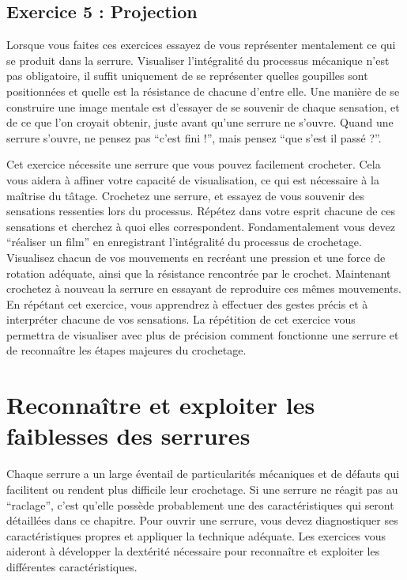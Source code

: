 \documentclass[a4paper,french,11pt,twoside]{report}
\begin{document}
\section{Exercice 5 : Projection}
Lorsque vous faites ces exercices essayez de vous représenter mentalement ce qui se produit dans la serrure. Visualiser l'intégralité du processus mécanique n'est pas obligatoire, il suffit uniquement de se représenter quelles goupilles sont positionnées et quelle est la résistance de chacune d'entre elle. Une manière de se construire une image mentale est d'essayer de se souvenir de chaque sensation, et de ce que l'on croyait obtenir, juste avant qu'une serrure ne s'ouvre. Quand une serrure s'ouvre, ne pensez pas \enquote{c'est fini !}, mais pensez \enquote{que s'est il passé ?}.

Cet exercice nécessite une serrure que vous pouvez facilement crocheter. Cela vous aidera à affiner votre capacité de visualisation, ce qui est nécessaire à la maîtrise du tâtage. Crochetez une serrure, et essayez de vous souvenir des sensations ressenties lors du processus. Répétez dans votre esprit chacune de ces sensations et cherchez à quoi elles correspondent. Fondamentalement vous devez \enquote{réaliser un film} en enregistrant l'intégralité du processus de crochetage. Visualisez chacun de vos mouvements en recréant une pression et une force de rotation adéquate, ainsi que la résistance rencontrée par le crochet. Maintenant crochetez à nouveau la serrure en essayant de reproduire ces mêmes mouvements.
En répétant cet exercice, vous apprendrez à effectuer des gestes précis et à interpréter chacune de vos sensations. La répétition de cet exercice vous permettra de visualiser avec plus de précision comment fonctionne une serrure et de reconnaître les étapes majeures du crochetage.


\chapter{Reconnaître et exploiter les faiblesses des serrures}

Chaque serrure a un large éventail de particularités mécaniques et de défauts qui facilitent ou rendent plus difficile leur crochetage. Si une serrure ne réagit pas au \enquote{raclage}, c'est qu'elle possède probablement une des caractéristiques qui seront détaillées dans ce chapitre. Pour ouvrir une serrure, vous devez diagnostiquer ses caractéristiques propres et appliquer la technique adéquate. Les exercices vous aideront à développer la dextérité nécessaire pour reconnaître et exploiter les différentes caractéristiques.
\end{document}
